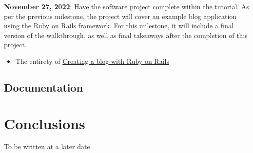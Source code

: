 \documentclass{article}
\theoremstyle{theorem}
\theoremstyle{definition}
\theoremstyle{remark}
\begin{document}
\noindent \textbf{November 27, 2022}: Have the software project complete within the tutorial. As per the previous milestone, the project will cover an example blog application using the Ruby on Rails framework. For this milestone, it will include a final version of the walkthrough, as well as final takeaways after the completion of this project.
\begin{itemize}
    \item The entirety of \href{https://hackmd.io/@evrahnos/ryTuitp8o}{Creating a blog with Ruby on Rails}
\end{itemize}

\newpage

\subsection{Documentation}





\section{Conclusions}\label{conclusions}

To be written at a later date.
\end{document}
